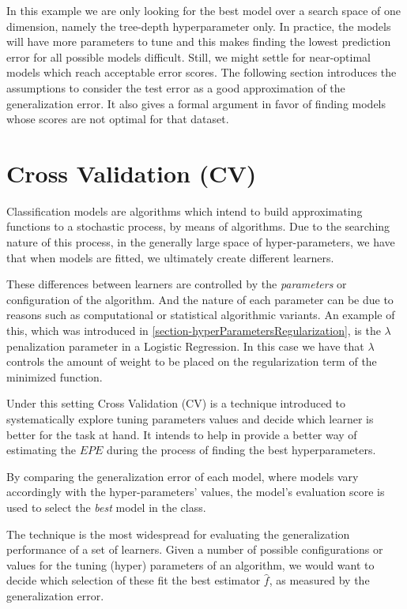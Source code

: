 In this example we are only looking for the best model over a search space of one dimension, namely the tree-depth hyperparameter only.
In practice, the models will have more parameters to tune and this makes finding the lowest prediction error for all possible models difficult.
Still, we might settle for near-optimal models which reach acceptable error scores.
The following section introduces the assumptions to consider the test error as a good approximation of the generalization error.
It also gives a formal argument in favor of finding models whose scores are not optimal for that dataset.


\section{Cross Validation (CV)}\label{section:crossValidation}

Classification models are algorithms which intend to build approximating functions to a stochastic process, by means of algorithms.
Due to the searching nature of this process, in the generally large space of hyper-parameters, we have that when models are fitted, we ultimately create different learners.

These differences between learners are controlled by the \textit{parameters} or configuration of the algorithm.
And the nature of each parameter can be due to reasons such as computational or statistical  algorithmic variants.
An example of this, which was introduced in \cref{section-hyperParametersRegularization}, is the $\lambda$ penalization parameter in a Logistic Regression.
In this case we have that $\lambda$ controls the amount of weight to be placed on the regularization term of the minimized function.


Under this setting Cross Validation (CV) is a technique introduced to systematically explore tuning parameters values and decide which learner is better for the task at hand.
It intends to help in provide a better way of estimating the $EPE$ during the process of finding the best hyperparameters.

By comparing the generalization error of each model, where models vary accordingly with the hyper-parameters' values, the model's evaluation score is used to select the \textit{best} model in the class.

The technique is the most widespread for evaluating the generalization performance of a set of learners.
Given a number of possible configurations or values for the tuning (hyper) parameters of an algorithm, we would want to decide which selection of these fit the best estimator $\hat{f}$, as measured by the generalization error.

